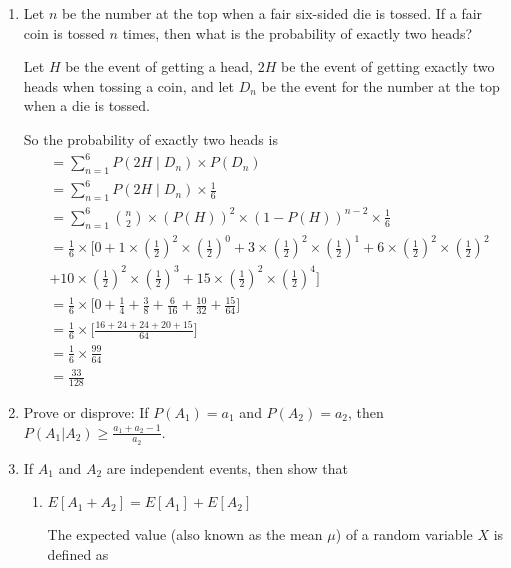 \begin{enumerate}
\item \relax[3 points] Let $n$ be the number at the top when a fair
  six-sided die is tossed. If a fair coin is tossed $n$ times, then
  what is the probability of exactly two heads?

Let $H$ be the event of getting a head, $2H$ be the event of getting exactly two heads when tossing a coin, and let $D_n$ be the event for the number at the top when a die is tossed.

So the probability of exactly two heads is
\begin{equation*}
\begin{aligned}
&= \sum_{n=1}^6  P(2H \mid D_n) \times P(D_n)\\
&= \sum_{n=1}^6  P(2H \mid D_n) \times \frac{1}{6}\\
&= \sum_{n=1}^6  {n \choose 2} \times \left( P(H) \right ) ^ 2  \times \left(1- P(H) \right ) ^ {n-2} \times \frac{1}{6}\\
&= \frac{1}{6} \times \bigl [ 0 +  1 \times \left(\frac{1}{2} \right)^2 \times \left (\frac{1}{2}\right )^0 + 3 \times \left(\frac{1}{2} \right)^2 \times \left (\frac{1}{2}\right )^1 + 6 \times \left(\frac{1}{2} \right)^2 \times \left (\frac{1}{2}\right )^2 \\
&+10 \times \left(\frac{1}{2} \right)^2 \times \left (\frac{1}{2}\right )^3  + 15 \times \left(\frac{1}{2} \right)^2 \times \left (\frac{1}{2}\right )^4 \bigr ]\\
&= \frac{1}{6} \times \bigl [ 0 +  \frac{1}{4} + \frac{3}{8} + \frac{6}{16} + \frac{10}{32} + \frac{15}{64}\bigr ]\\
&= \frac{1}{6} \times \bigl [ \frac{16+24+ 24+20+15}{64}\bigr ]\\
&=\frac{1}{6} \times\frac{99}{64} \\
&=\frac{33}{128}
\end{aligned}   
\end{equation*}  
  
\item \relax[4 points] Prove or disprove: If $P(A_1) = a_1$ and
  $P(A_2) = a_2$, then $P(A_1 | A_2) \geq \frac{a_1 + a_2 -1}{a_2}$.
\item \relax[8 points] If $A_1$ and $A_2$ are independent events, then
  show that
  \begin{enumerate}
  \item $E[A_1 + A_2] = E[A_1] + E[A_2]$

The expected value (also known as the mean $\mu$) of a random variable $X$ is defined as 


\end{enumerate}
\end{enumerate}
